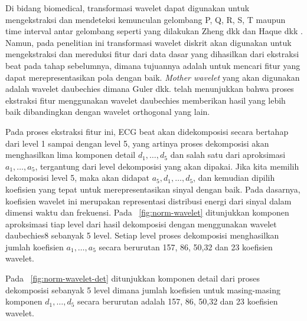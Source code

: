 
Di bidang biomedical, transformasi wavelet dapat digunakan untuk mengekstraksi
dan mendeteksi kemunculan gelombang P, Q, R, S, T maupun time interval antar
gelombang seperti yang dilakukan Zheng dkk\cite{Zheng:1995} dan Haque dkk
\cite{haque:2002}. Namun, pada penelitian ini transformasi wavelet diskrit 
akan digunakan untuk mengekstraksi dan mereduksi fitur dari data dasar
yang dihasilkan dari ekstraksi beat pada tahap sebelumnya, dimana tujuannya
adalah untuk mencari fitur yang dapat merepresentasikan pola dengan baik.
\emph{Mother wavelet} yang akan digunakan adalah wavelet daubechies dimana Guler
dkk.\cite{guler:2005} telah menunjukkan bahwa proses ekstraksi fitur menggunakan
wavelet daubechies memberikan hasil yang lebih baik dibandingkan dengan wavelet
orthogonal yang lain.


Pada proses ekstraksi fitur ini, ECG beat akan didekomposisi secara bertahap
dari level 1 sampai dengan level 5, yang artinya proses dekomposisi akan
menghasilkan lima komponen detail $d_1,\dots, d_5$ dan salah satu dari
aproksimasi $a_1, \dots, a_5$, tergantung dari level dekomposisi yang akan
dipakai. Jika kita memilih dekomposisi level 5, maka akan didapat $a_5,
d_1,\dots,d_5$, dan kemudian dipilih koefisien yang tepat untuk
merepresentasikan sinyal dengan baik. Pada dasarnya, koefisien wavelet ini
merupakan representasi distribusi energi dari sinyal dalam dimensi waktu dan
frekuensi. Pada \pic~\ref{fig:norm-wavelet} ditunjukkan komponen aproksimasi tiap
level dari hasil dekomposisi dengan menggunakan wavelet daubechies8 sebanyak 5
level. Setiap level proses dekomposisi menghasilkan jumlah koefisien $a_1,
\dots, a_5$ secara berurutan 157, 86, 50,32 dan 23 koefisien wavelet. 

Pada \pic~\ref{fig:norm-wavelet-det} ditunjukkan komponen detail dari proses
dekomposisi sebanyak 5 level dimana jumlah koefisien untuk masing-masing
komponen $d_1,\dots, d_5$ secara berurutan adalah 157, 86, 50,32 dan 23
koefisien wavelet.  

